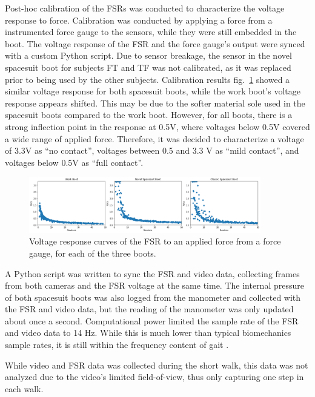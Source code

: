 \documentclass[defaultstyle,11pt]{thesis}
\begin{document}
Post-hoc calibration of the FSRs was conducted to characterize the voltage response to force.
Calibration was conducted by applying a force from a instrumented force gauge to the sensors, while they were still embedded in the boot.
The voltage response of the FSR and the force gauge's output were synced with a custom Python script.
Due to sensor breakage, the sensor in the novel spacesuit boot for subjects FT and TF was not calibrated, as it was replaced prior to being used by the other subjects.
Calibration results fig.~\ref{fig:SA4-FSRcal} showed a similar voltage response for both spacesuit boots, while the work boot's voltage response appears shifted.
This may be due to the softer material sole used in the spacesuit boots compared to the work boot.
However, for all boots, there is a strong inflection point in the response at 0.5V, where voltages below 0.5V covered a wide range of applied force.
Therefore, it was decided to characterize a voltage of 3.3V as ``no contact'', voltages between 0.5 and 3.3 V as ``mild contact'', and voltages below 0.5V as ``full contact''.

\begin{figure}
\hypertarget{fig:SA4-FSRcal}{%
\centering
\includegraphics[width=0.9\textwidth,height=\textheight]{../fig/SA4/FSR_cal.png}
\caption{Voltage response curves of the FSR to an applied force from a force gauge, for each of the three boots.}\label{fig:SA4-FSRcal}
}
\end{figure}

A Python script was written to sync the FSR and video data, collecting frames from both cameras and the FSR voltage at the same time.
The internal pressure of both spacesuit boots was also logged from the manometer and collected with the FSR and video data, but the reading of the manometer was only updated about once a second.
Computational power limited the sample rate of the FSR and video data to 14 Hz.
While this is much lower than typical biomechanics sample rates, it is still within the frequency content of gait \citep{Antonsson1985}.

While video and FSR data was collected during the short walk, this data was not analyzed due to the video's limited field-of-view, thus only capturing one step in each walk.
\end{document}
